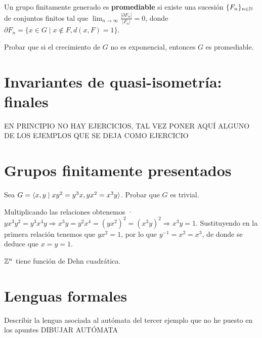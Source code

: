 \documentclass[twoside]{article}
\begin{document}
\newpage

\begin{ejercicio}{2.4}
Un grupo finitamente generado es \textbf{promediable} si existe una sucesión $\{F_n\}_{n\in\mathbb{N}}$ de conjuntos finitos tal que $\lim_{n\to\infty}\frac{|\partial F_n|}{|F_n|}=0$, donde $\partial F_n=\{x\in G\mid x\notin F, d(x,F)=1\}$.

Probar que si el crecimiento de $G$ no es exponencial, entonces $G$ es promediable. 
\end{ejercicio}
\begin{solucion}

\end{solucion}

\newpage

\section{Invariantes de quasi-isometría: finales}

EN PRINCIPIO NO HAY EJERCICIOS, TAL VEZ PONER AQUÍ ALGUNO DE LOS EJEMPLOS QUE SE DEJA COMO EJERCICIO

\section{Grupos finitamente presentados}
\begin{ejercicio}{3.1}

Sea $G=\langle{x,y\mid xy^2=y^3x, yx^2=x^3y}\rangle$. Probar que $G$ es trivial.
\end{ejercicio}
\begin{solucion}
Multiplicando las relaciones obtenemos ·$yx^3y^2=y^3x^4y\Rightarrow x^3y=y^2x^4=(yx^2)^2=(x^3y)^2\Rightarrow x^3y=1$. Sustituyendo en la primera relación tenemos que $yx^2=1$, por lo que $y^{-1}=x^2=x^3$, de donde se deduce que $x=y=1$.
\end{solucion}

\newpage

\begin{ejercicio}{3.2}
$\mathbb{Z}^n$ tiene función de Dehn cuadrática. 
\end{ejercicio}
\begin{solucion}
\end{solucion}

\newpage

\section{Lenguas formales}

\begin{ejercicio}{4.1}
Describir la lengua asociada al autómata del tercer ejemplo que no he puesto en los apuntes DIBUJAR AUTÓMATA
\end{ejercicio}
\begin{solucion}

\end{solucion}
\end{document}
